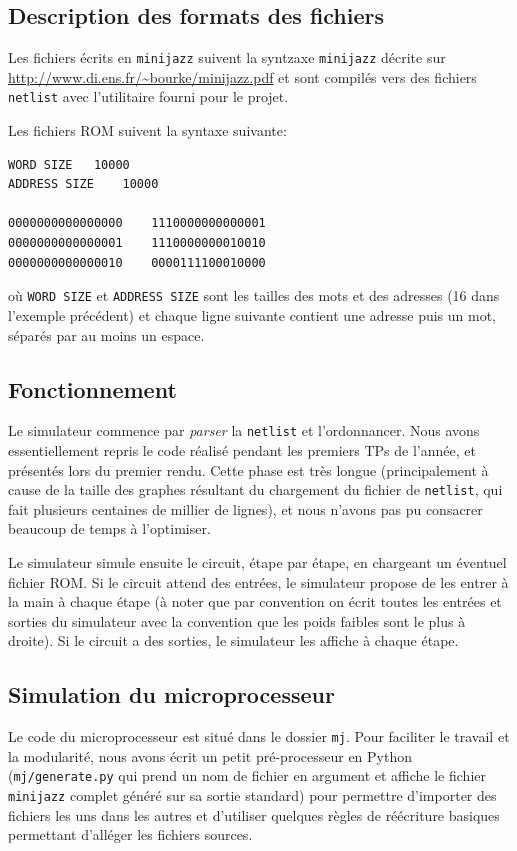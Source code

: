 \documentclass[11pt]{article}
\begin{document}
\subsection{Description des formats des fichiers}

Les fichiers écrits en \texttt{minijazz} suivent la syntzaxe \texttt{minijazz} décrite sur \url{http://www.di.ens.fr/~bourke/minijazz.pdf} et sont compilés vers des fichiers \texttt{netlist} avec l'utilitaire fourni pour le projet.

Les fichiers ROM suivent la syntaxe suivante:
\begin{verbatim}
WORD SIZE	10000
ADDRESS SIZE	10000

0000000000000000	1110000000000001
0000000000000001	1110000000010010
0000000000000010	0000111100010000
\end{verbatim}
où \texttt{WORD SIZE} et \texttt{ADDRESS SIZE} sont les tailles des mots et des adresses (16 dans l'exemple précédent) et chaque ligne suivante contient une adresse puis un mot, séparés par au moins un espace.

\subsection{Fonctionnement}

Le simulateur commence par \emph{parser} la \texttt{netlist} et l'ordonnancer. Nous avons essentiellement repris le code réalisé pendant les premiers TPs de l'année, et présentés lors du premier rendu. Cette phase est très longue (principalement à cause de la taille des graphes résultant du chargement du fichier de \texttt{netlist}, qui fait plusieurs centaines de millier de lignes), et nous n'avons pas pu consacrer beaucoup de temps à l'optimiser.

Le simulateur simule ensuite le circuit, étape par étape, en chargeant un éventuel fichier ROM. Si le circuit attend des entrées, le simulateur propose de les entrer à la main à chaque étape (à noter que par convention on écrit toutes les entrées et sorties du simulateur avec la convention que les poids faibles sont le plus à droite). Si le circuit a des sorties, le simulateur les affiche à chaque étape.

\subsection{Simulation du microprocesseur}

Le code du microprocesseur est situé dans le dossier \texttt{mj}. Pour faciliter le travail et la modularité, nous avons écrit un petit pré-processeur en Python (\texttt{mj/generate.py} qui prend un nom de fichier en argument et affiche le fichier \texttt{minijazz} complet généré sur sa sortie standard) pour permettre d'importer des fichiers les uns dans les autres et d'utiliser quelques règles de réécriture basiques permettant d'alléger les fichiers sources.
\end{document}

